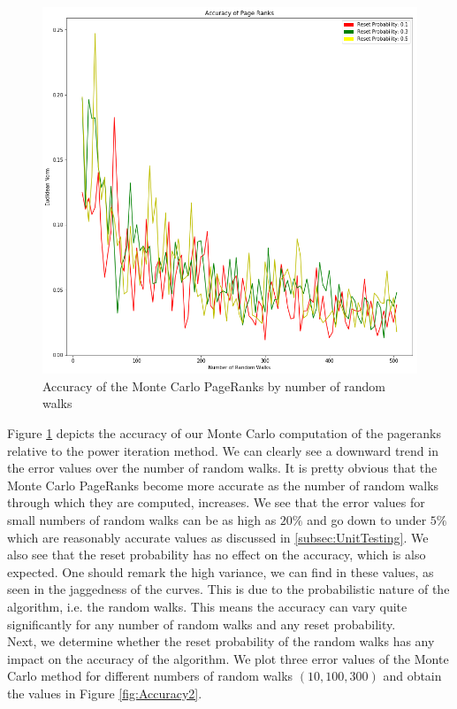 \documentclass[sigconf]{acmart}
\theoremstyle{definition}
\begin{document}
\begin{figure}
\includegraphics[scale=0.3]{Accuracy1}
\caption{Accuracy of the Monte Carlo PageRanks by number of random walks}
\label{fig:Accuracy1}
\end{figure}

\noindent Figure \ref{fig:Accuracy1} depicts the accuracy of our Monte Carlo computation of the pageranks relative to the power iteration method. We can clearly see a downward trend in the error values over the number of random walks. It is pretty obvious that the Monte Carlo PageRanks become more accurate as the number of random walks through which they are computed, increases. We see that the error values for small numbers of random walks can be as high as $20\%$ and go down to under $5\%$ which are reasonably accurate values as discussed in \ref{subsec:UnitTesting}. We also see that the reset probability has no effect on the accuracy, which is also expected. One should remark the high variance, we can find in these values, as seen in the jaggedness of the curves. This is due to the probabilistic nature of the algorithm, i.e. the random walks. This means the accuracy can vary quite significantly for any number of random walks and any reset probability. \vspace{1em}\\

\noindent Next, we determine whether the reset probability of the random walks has any impact on the accuracy of the algorithm. We plot three error values of the Monte Carlo method for different numbers of random walks $(10, 100, 300)$ and obtain the values in Figure \ref{fig:Accuracy2}. \vspace{1em}\\ 
\end{document}
